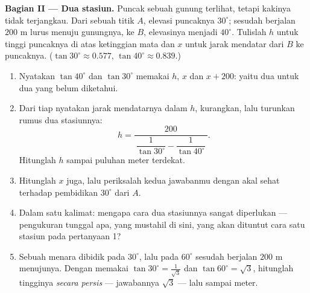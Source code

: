 \begin{problem}
\medskip
\noindent\textbf{Bagian II --- Dua stasiun.}
Puncak sebuah gunung terlihat, tetapi kakinya tidak terjangkau. Dari
sebuah titik $A$, elevasi puncaknya $30^\circ$; sesudah berjalan
$200$ m lurus menuju gunungnya, ke $B$, elevasinya menjadi
$40^\circ$. Tulislah $h$ untuk tinggi puncaknya di atas ketinggian
mata dan $x$ untuk jarak mendatar dari $B$ ke 
puncaknya. ($\tan 30^\circ \approx 0.577$,
$\tan 40^\circ \approx 0.839$.)
\begin{enumerate}[resume]
  \item Nyatakan $\tan 40^\circ$ dan $\tan 30^\circ$ memakai $h$,
        $x$ dan $x + 200$: yaitu dua  untuk dua yang belum
        diketahui.
  \item Dari tiap  nyatakan jarak mendatarnya dalam
        $h$, kurangkan, lalu turunkan rumus dua stasiunnya:
        \[
        h = \frac{200}
        {\ \dfrac{1}{\tan 30^\circ} - \dfrac{1}{\tan 40^\circ}\ } .
        \]
        Hitunglah $h$ sampai puluhan meter terdekat.
  \item Hitunglah $x$ juga, lalu periksalah kedua jawabanmu dengan
        akal sehat terhadap pembidikan $30^\circ$ dari $A$.
  \item Dalam satu kalimat: mengapa cara dua stasiunnya
        sangat diperlukan --- pengukuran tunggal apa, yang mustahil
        di sini, yang akan dituntut cara satu stasiun pada
        pertanyaan 1?
  \item Sebuah menara dibidik pada $30^\circ$, lalu pada $60^\circ$
        sesudah berjalan $200$ m menujunya. Dengan memakai
        $\tan 30^\circ = \frac{1}{\sqrt3}$ dan
        $\tan 60^\circ = \sqrt3$, hitunglah tingginya
        \emph{secara persis} --- jawabannya 
        $\sqrt3$ --- lalu sampai meter.
\end{enumerate}


\end{problem}
